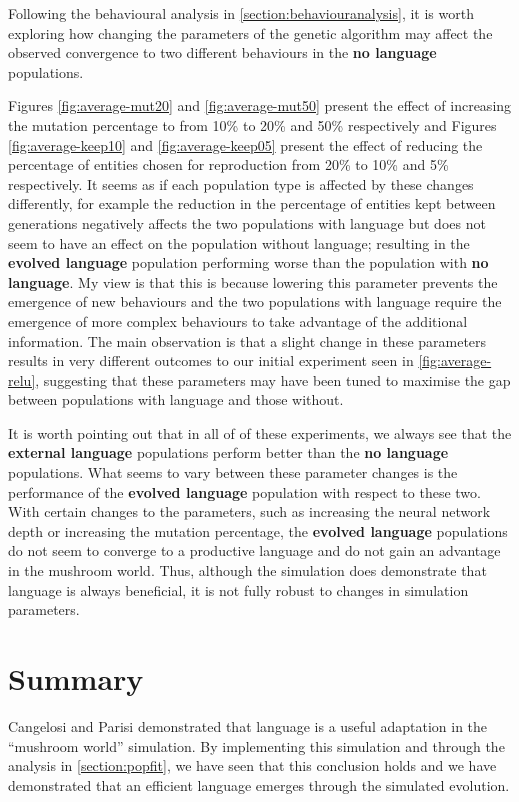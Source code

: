 \documentclass[12pt,a4paper]{report}
\begin{document}
Following the behavioural analysis in \cref{section:behaviouranalysis}, it is worth exploring how changing the parameters of the genetic algorithm may affect the observed convergence to two different behaviours in the {\bf no language} populations.

Figures \ref{fig:average-mut20} and \ref{fig:average-mut50} present the effect of increasing the mutation percentage to from 10\% to 20\% and 50\% respectively and Figures \ref{fig:average-keep10} and \ref{fig:average-keep05} present the effect of reducing the percentage of entities chosen for reproduction from 20\% to 10\% and 5\% respectively. It seems as if each population type is affected by these changes differently, for example the reduction in the percentage of entities kept between generations negatively affects the two populations with language but does not seem to have an effect on the population without language; resulting in the {\bf evolved language} population performing worse than the population with {\bf no language}. My view is that this is because lowering this parameter prevents the emergence of new behaviours and the two populations with language require the emergence of more complex behaviours to take advantage of the additional information. The main observation is that a slight change in these parameters results in very different outcomes to our initial experiment seen in \cref{fig:average-relu}, suggesting that these parameters may have been tuned to maximise the gap between populations with language and those without.

It is worth pointing out that in all of of these experiments, we always see that the {\bf external language} populations perform better than the {\bf no language} populations. What seems to vary between these parameter changes is the performance of the {\bf evolved language} population with respect to these two. With certain changes to the parameters, such as increasing the neural network depth or increasing the mutation percentage, the {\bf evolved language} populations do not seem to converge to a productive language and do not gain an advantage in the mushroom world. Thus, although the simulation does demonstrate that language is always beneficial, it is not fully robust to changes in simulation parameters.

 \section{Summary}
 
Cangelosi and Parisi demonstrated that language is a useful adaptation in the ``mushroom world'' simulation. By implementing this simulation and through the analysis in \cref{section:popfit}, we have seen that this conclusion holds and we have demonstrated that an efficient language emerges through the simulated evolution.
\end{document}
